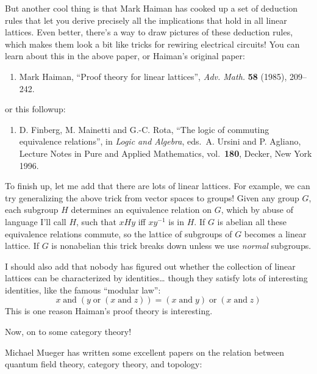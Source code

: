 \documentclass{article}
\def\tightlist{}
\begin{document}
But another cool thing is that Mark Haiman has cooked up a set of
deduction rules that let you derive precisely all the implications that
hold in all linear lattices. Even better, there's a way to draw pictures
of these deduction rules, which makes them look a bit like tricks for
rewiring electrical circuits! You can learn about this in the above
paper, or Haiman's original paper:

\begin{enumerate}
\def\labelenumi{\arabic{enumi})}
\setcounter{enumi}{3}
\tightlist
\item
  Mark Haiman, ``Proof theory for linear lattices'', \emph{Adv. Math.}
  \textbf{58} (1985), 209--242.
\end{enumerate}

or this followup:

\begin{enumerate}
\def\labelenumi{\arabic{enumi})}
\setcounter{enumi}{4}
\tightlist
\item
  D. Finberg, M. Mainetti and G.-C. Rota, ``The logic of commuting
  equivalence relations'', in \emph{Logic and Algebra}, eds.~A. Ursini
  and P. Agliano, Lecture Notes in Pure and Applied Mathematics,
  vol.~\textbf{180}, Decker, New York 1996.
\end{enumerate}

To finish up, let me add that there are lots of linear lattices. For
example, we can try generalizing the above trick from vector spaces to
groups! Given any group \(G\), each subgroup \(H\) determines an
equivalence relation on \(G\), which by abuse of language I'll call
\(H\), such that \(xHy\) iff \(xy^{-1}\) is in \(H\). If \(G\) is
abelian all these equivalence relations commute, so the lattice of
subgroups of \(G\) becomes a linear lattice. If \(G\) is nonabelian this
trick breaks down unless we use \emph{normal} subgroups.

I should also add that nobody has figured out whether the collection of
linear lattices can be characterized by identities\ldots{} though they
satisfy lots of interesting identities, like the famous ``modular law'':
\[x \operatorname{and} (y \operatorname{or} (x \operatorname{and} z)) = (x \operatorname{and} y) \operatorname{or} (x \operatorname{and} z)\]
This is one reason Haiman's proof theory is interesting.

Now, on to some category theory!

Michael Mueger has written some excellent papers on the relation between
quantum field theory, category theory, and topology:
\end{document}
